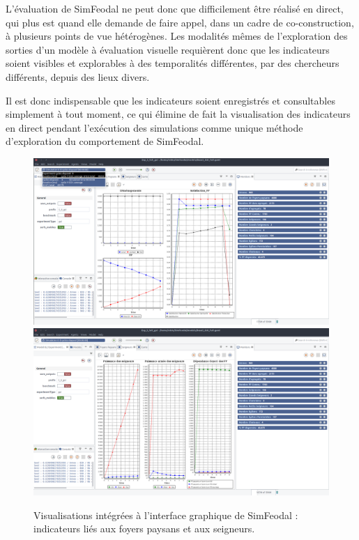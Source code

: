 	L'évaluation de SimFeodal ne peut donc que difficilement être réalisé en direct, qui plus est quand elle demande de faire appel, dans un cadre de co-construction, à plusieurs points de vue hétérogènes.
	Les modalités mêmes de l'exploration des sorties d'un modèle à évaluation visuelle requièrent donc que les indicateurs soient visibles et explorables à des temporalités différentes, par des chercheurs différents, depuis des lieux divers.
	
	Il est donc indispensable que les indicateurs soient enregistrés et consultables simplement à tout moment, ce qui élimine de fait la visualisation des indicateurs en direct pendant l'exécution des simulations comme unique méthode d'exploration du comportement de SimFeodal.
	
	
	\begin{figure}[H]
		\captionsetup{width=\linewidth}
		\includegraphics[width=\linewidth]{img/SimFeodal_GUI_FP.png}
		\includegraphics[width=\linewidth]{img/SimFeodal_GUI_seigneurs.png}
		\caption{Visualisations intégrées à l'interface graphique de SimFeodal : indicateurs liés aux foyers paysans et aux seigneurs.}
		\label{fig:simfeodal_gui_indicateurs}
	\end{figure}
	
